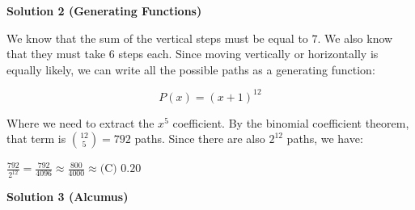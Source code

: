 \begin{enumerate}
 



\textbf{Solution 2 (Generating Functions)}

We know that the sum of the vertical steps must be equal to $7$. We also know that they must take $6$ steps each. Since moving vertically or horizontally is equally likely, we can write all the possible paths as a generating function:

 
 \[P(x)=(x+1)^{12}\]

 Where we need to extract the $x^5$ coefficient. By the binomial coefficient theorem, that term is $\binom{12}{5}=792$ paths. Since there are also $2^{12}$ paths, we have:

 $\frac{792}{2^{12}}=\frac{792}{4096}\approx\frac{800}{4000}\approx\boxed{\text{(C) } 0.20}$




\textbf{Solution 3 (Alcumus)}


\end{enumerate}
